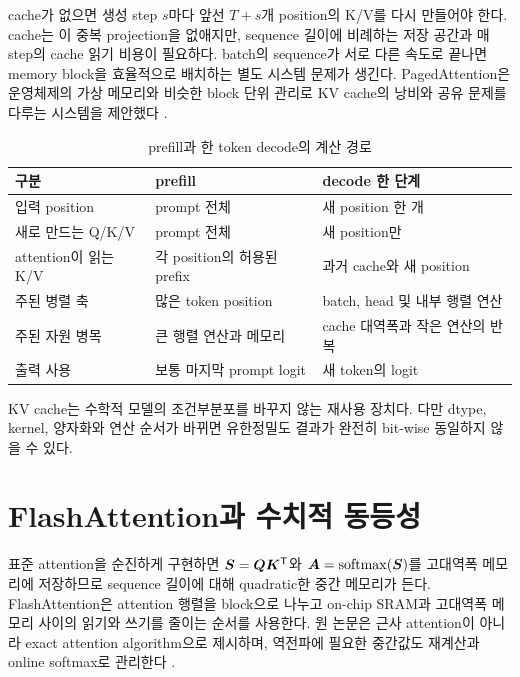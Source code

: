 cache가 없으면 생성 step $s$마다 앞선 $T+s$개 position의 K/V를 다시 만들어야 한다.
cache는 이 중복 projection을 없애지만, sequence 길이에 비례하는 저장 공간과 매 step의 cache 읽기 비용이 필요하다.
batch의 sequence가 서로 다른 속도로 끝나면 memory block을 효율적으로 배치하는 별도 시스템 문제가 생긴다.
PagedAttention은 운영체제의 가상 메모리와 비슷한 block 단위 관리로 KV cache의 낭비와 공유 문제를 다루는 시스템을 제안했다 \citep{kwon2023pagedattention}.

\begin{table}[htbp]
\centering
\caption{prefill과 한 token decode의 계산 경로}
\label{tab:prefill-decode}
\begin{tabularx}{\textwidth}{@{}lYY@{}}
\toprule
구분 & prefill & decode 한 단계 \\
\midrule
입력 position & prompt 전체 & 새 position 한 개 \\
새로 만드는 Q/K/V & prompt 전체 & 새 position만 \\
attention이 읽는 K/V & 각 position의 허용된 prefix & 과거 cache와 새 position \\
주된 병렬 축 & 많은 token position & batch, head 및 내부 행렬 연산 \\
주된 자원 병목 & 큰 행렬 연산과 메모리 & cache 대역폭과 작은 연산의 반복 \\
출력 사용 & 보통 마지막 prompt logit & 새 token의 logit \\
\bottomrule
\end{tabularx}
\end{table}

KV cache는 수학적 모델의 조건부분포를 바꾸지 않는 재사용 장치다.
다만 dtype, kernel, 양자화와 연산 순서가 바뀌면 유한정밀도 결과가 완전히 bit-wise 동일하지 않을 수 있다.

\section{FlashAttention과 수치적 동등성}

표준 attention을 순진하게 구현하면 $\bm{S}=\bm{Q}\bm{K}^{\mathsf T}$와 $\bm{A}=\operatorname{softmax}(\bm{S})$를 고대역폭 메모리에 저장하므로 sequence 길이에 대해 quadratic한 중간 메모리가 든다.
FlashAttention은 attention 행렬을 block으로 나누고 on-chip SRAM과 고대역폭 메모리 사이의 읽기와 쓰기를 줄이는 순서를 사용한다.
원 논문은 근사 attention이 아니라 exact attention algorithm으로 제시하며, 역전파에 필요한 중간값도 재계산과 online softmax로 관리한다 \citep{dao2022flashattention}.

